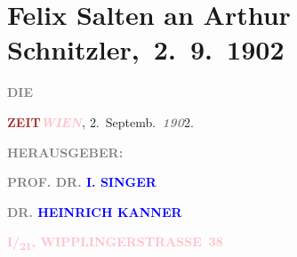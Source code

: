 

\renewcommand{\erwaehntePersonen}{Personen: Heinrich Kanner, Isidor Singer}
\renewcommand{\erwaehnteInstitutionen}{Institutionen: Die Zeit}
\renewcommand{\erwaehnteOrte}{Orte: Leoben, Niederösterreich, Steiermark, Wien, Wipplingerstraße}
\renewcommand{\erwaehnteWerke}{Werke: Die Zeit, Die griechische Tänzerin. Novellette}
\section[ Felix Salten an Arthur Schnitzler, 2. 9. 1902]{Felix Salten an Arthur Schnitzler, 2. 9. 1902}
\nopagebreak{}
\rehead{ }\normalsize\beginnumbering{}
\toendnotes[C]{\smallbreak\pagebreak[2]}
\toendnotes[C]{\smallbreak}
\pstart
           \noindent{}{\pb}\textcolor{gray}{\textbf{DIE}}\pend
           
\pstart
           \textcolor{gray}{\textbf{\textcolor{brown}{ZEIT}{}\ledrightnote{\textcolor{brown}{Die Zeit}}}}\hfill \textcolor{gray}{\textbf{\emph{\textcolor{pink}{WIEN}{}\ledrightnote{\textcolor{pink}{Wien}}},}}{ }2. Septemb. \textcolor{gray}{\textbf{\emph{190}}}2.\pend
           
\pstart
           \textcolor{gray}{\textbf{\textsc{\textbf{}}}}\pend
           
\pstart
           \textcolor{gray}{\textbf{HERAUSGEBER:}}\pend
           
\pstart
           \textcolor{gray}{\textbf{\textbf{PROF. DR. \textcolor{blue}{I. SINGER}{}\ledrightnote{\textcolor{blue}{Isidor Singer}}}}}\pend
           
\pstart
           \textcolor{gray}{\textbf{\textbf{DR. \textcolor{blue}{HEINRICH KANNER}{}\ledrightnote{\textcolor{blue}{Heinrich Kanner}}}}}\pend
           
\pstart
           \textcolor{gray}{\textbf{\textbf{}}}\pend
           
\pstart
           \textcolor{gray}{\textbf{\textcolor{pink}{I/\textsubscript{21},
                           WIPPLINGERSTRASSE 38}{}\ledrightnote{\textcolor{pink}{Wipplingerstraße}}}}\pend
           
